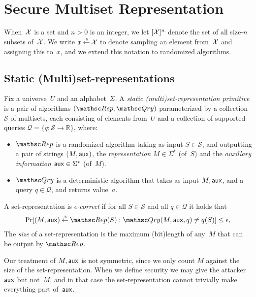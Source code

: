 \section{Secure Multiset Representation}
\def\pub{{\sf pub}}
\def\aux{{\sf aux}}

When~${\cal X}$ is a set and $n>0$ is an integer, we let $[{\cal X}]^n$ denote the set of all size-$n$ subsets of~${\cal X}$. We write $x {\:\stackrel{{\scriptscriptstyle \hspace{0.2em}\$}} {\leftarrow}\:} {\cal X}$ to denote sampling an element from~${\cal X}$ and assigning this to~$x$, and we extend this notation to randomized algorithms.

\subsection{Static (Multi)set-representations}
\begin{definition} %
Fix a universe~$U$ and an alphabet~$\Sigma$.  A \emph{static (multi)set-representation primitive} is a pair of algorithms $(\Rep, \Qry)$
parameterized by a collection $\mathcal{S}$ of multisets, each consisting of elements from~$U$ and a collection
of supported queries $\mathcal{Q}=\{q \colon \mathcal{S} \to \mathbb{R}\}$, where:
\begin{itemize}
\item $\Rep$ is a randomized algorithm taking as input $S \in \mathcal{S}$,
and outputting a pair of strings $(M,\aux)$, the \emph{representation} $M \in \Sigma^*$ (of~$S$) 
and the \emph{auxillary information} $\aux \in \Sigma^*$ (of~$M$).
\item $\Qry$ is a deterministic algorithm that takes as input $M, \aux$,
and a query $q\in \mathcal{Q}$, and returns value~$a$.
\end{itemize}
A set-representation is \emph{$\epsilon$-correct} if for all $S \in \mathcal{S}$ and
all $q \in \mathcal{Q}$ it holds that
\begin{eqnarray}
\Pr[(M,\aux) \getsr \Rep(S) : \Qry(M, \aux, q) \neq q(S)] \leq \epsilon, \label{eqn:correctness}
\end{eqnarray}
The \emph{size} of a set-representation is the maximum (bit)length of any~$M$ that can be
output by $\Rep$.
\end{definition}

Our treatment of $M,\aux$ is not symmetric, since we only count $M$ against the size
of the set-representation. When we define security
we may give the attacker $\aux$ but not~$M$, and in that case the set-representation cannot
trivially make everything part of~$\aux$. 

